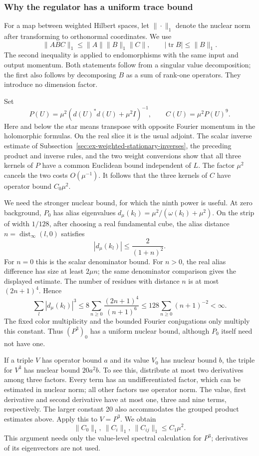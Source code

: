 \subsubsection{Why the regulator has a uniform trace bound}
For a map between weighted Hilbert spaces, let $\|\cdot\|_1$ denote
the nuclear norm after transforming to orthonormal coordinates.
We use
\[
 \|ABC\|_1\leq\|A\|\|B\|_1\|C\|,
 \qquad |\operatorname{tr}B|\leq\|B\|_1.
\]
The second inequality is applied to endomorphisms with the same
input and output momentum. Both statements follow from a singular
value decomposition; the first also follows by decomposing $B$ as
a sum of rank-one operators. They introduce no dimension factor.

Set
\[
 P(U)=\mu^2(d(U)^*d(U)+\mu^2I)^{-1},\qquad
 C(U)=\mu^2P(U)^9.
\]
Here and below the star means transpose with opposite Fourier
momentum in the holomorphic formulas. On the real slice it is the
usual adjoint. The scalar inverse estimate of
Subsection~\ref{sec:ex-weighted-stationary-inverses}, the preceding
product and inverse rules, and the two weight conversions show that
all three kernels of $P$ have a common Euclidean bound independent
of $L$. The factor $\mu^2$ cancels the two costs $O(\mu^{-1})$.
It follows that the three kernels of $C$ have operator bound
$C_0\mu^2$.

We need the stronger nuclear bound, for which the ninth power is
useful. At zero background, $P_0$ has alias eigenvalues
$d_\mu(k_l)=\mu^2/(\omega(k_l)+\mu^2)$. On the strip of width
$1/128$, after choosing a real fundamental cube, the alias distance
$n=\operatorname{dist}_\infty(l,0)$ satisfies
\[
 |d_\mu(k_l)|\leq\frac{2}{(1+n)^2}.
\]
For $n=0$ this is the scalar denominator bound. For $n>0$, the
real alias difference has size at least $2\mu n$; the same
denominator comparison gives the displayed estimate. The number
of residues with distance $n$ is at most $(2n+1)^4$. Hence
\[
 \sum_l |d_\mu(k_l)|^3
 \leq 8\sum_{n\geq0}\frac{(2n+1)^4}{(n+1)^6}
 \leq128\sum_{n\geq0}(n+1)^{-2}<\infty.
\]
The fixed color multiplicity and the bounded Fourier conjugations
only multiply this constant. Thus $(P^3)_0$ has a uniform nuclear
bound, although $P_0$ itself need not have one.

If a triple $V$ has operator bound $a$ and its value $V_0$ has
nuclear bound $b$, the triple for $V^3$ has nuclear bound
$20a^2b$. To see this, distribute at most two derivatives among
three factors. Every term has an undifferentiated factor, which
can be estimated in nuclear norm; all other factors use operator
norm. The value, first derivative and second derivative have at
most one, three and nine terms, respectively. The larger constant
20 also accommodates the grouped product estimates above.
Apply this to $V=P^3$. We obtain
\begin{equation}\label{eq:ex-regulator-nuclear}
       \|C_0\|_1,\ \|C_i\|_1,\ \|C_{ij}\|_1
                          \leq C_1\mu^2.
\end{equation}
This argument needs only the value-level spectral calculation for
$P^3$; derivatives of its eigenvectors are not used.

